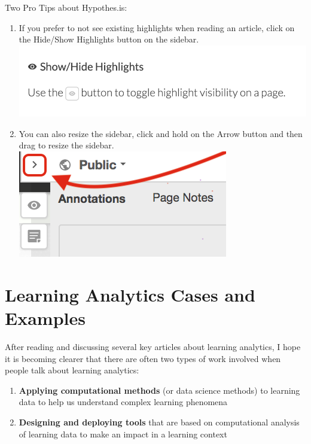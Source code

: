 \documentclass[
]{book}
\providecommand{\tightlist}{%
  \setlength{\itemsep}{0pt}\setlength{\parskip}{0pt}}
\begin{document}
Two Pro Tips about Hypothes.is:

\begin{enumerate}
\def\labelenumi{\arabic{enumi}.}
\tightlist
\item
  If you prefer to not see existing highlights when reading an article, click on the Hide/Show Highlights button on the sidebar.\\
  \includegraphics{img/h_hide_highlights.png}
\item
  You can also resize the sidebar, click and hold on the Arrow button and then drag to resize the sidebar.\\
  \includegraphics{img/h-resize-sidebar.png}
\end{enumerate}

\hypertarget{learning-analytics-cases-and-examples}{%
\section{Learning Analytics Cases and Examples}\label{learning-analytics-cases-and-examples}}

After reading and discussing several key articles about learning analytics, I hope it is becoming clearer that there are often two types of work involved when people talk about learning analytics:

\begin{enumerate}
\def\labelenumi{\arabic{enumi}.}
\tightlist
\item
  \textbf{Applying computational methods} (or data science methods) to learning data to help us understand complex learning phenomena
\item
  \textbf{Designing and deploying tools} that are based on computational analysis of learning data to make an impact in a learning context
\end{enumerate}
\end{document}
